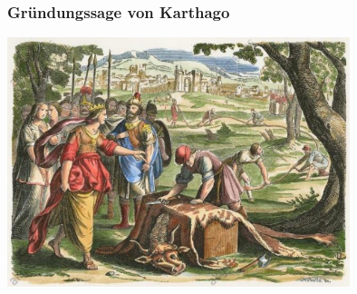 %
%
%
\bgroup
\begin{frame}[t]
\setlength{\abovedisplayskip}{5pt}
\setlength{\belowdisplayskip}{5pt}
\frametitle{Gründungssage von Karthago}
\begin{center}
\includegraphics[width=10cm]{../slides/3/dido.jpg}
\end{center}
\end{frame}
\egroup
